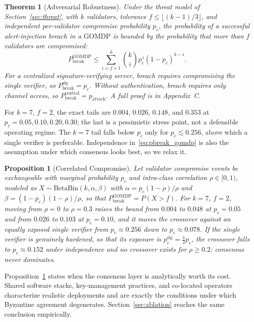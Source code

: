 \documentclass[letterpaper]{article} %
\newtheorem{theorem}{Theorem}
\newtheorem{proposition}{Proposition}
\newcommand{\GOMDP}{\text{GOMDP}}
\newcommand{\Pbreak}{P_{\text{break}}}
\newcommand{\appProofTwo}{C}
\begin{document}
\begin{theorem}[Adversarial Robustness]
\label{thm:adversarial}
Under the threat model of Section~\ref{sec:threat}, with $k$ validators, tolerance $f\leq\lfloor (k-1)/3\rfloor$, and independent per-validator compromise probability $p_c$, the probability of a successful alert-injection breach in a $\GOMDP$ is bounded by the probability that more than $f$ validators are compromised:
\begin{equation}
\Pbreak^{\GOMDP} \leq \sum_{i=f+1}^{k}\binom{k}{i}p_c^{\,i}(1-p_c)^{k-i}.
\label{eq:pbreak_gomdp}
\end{equation}
For a centralized signature-verifying server, breach requires compromising the single verifier, so $\Pbreak^{\mathrm{sig}}=p_c$. Without authentication, breach requires only channel access, so $\Pbreak^{\mathrm{central}}=p_{\mathrm{attack}}$. A full proof is in Appendix~\appProofTwo.
\end{theorem}

For $k=7$, $f=2$, the exact tails are $0.004$, $0.026$, $0.148$, and $0.353$ at $p_c=0.05, 0.10, 0.20, 0.30$; the last is a pessimistic stress point, not a defensible operating regime. The $k=7$ tail falls below $p_c$ only for $p_c\lesssim 0.256$, above which a single verifier is preferable. Independence in~\eqref{eq:pbreak_gomdp} is also the assumption under which consensus looks best, so we relax it.

\begin{proposition}[Correlated Compromise]
\label{prop:correlated}
Let validator compromise events be exchangeable with marginal probability $p_c$ and intra-class correlation $\rho\in[0,1)$, modeled as $X\sim\mathrm{BetaBin}(k,\alpha,\beta)$ with $\alpha=p_c(1-\rho)/\rho$ and $\beta=(1-p_c)(1-\rho)/\rho$, so that $\Pbreak^{\GOMDP}=P(X>f)$. For $k=7$, $f=2$, moving from $\rho=0$ to $\rho=0.3$ raises the bound from $0.004$ to $0.048$ at $p_c=0.05$ and from $0.026$ to $0.103$ at $p_c=0.10$, and it moves the crossover against an equally exposed single verifier from $p_c\approx 0.256$ down to $p_c\approx 0.078$. If the single verifier is genuinely hardened, so that its exposure is $p_c^{\mathrm{sig}}=\tfrac{1}{2}p_c$, the crossover falls to $p_c\approx 0.152$ under independence and \emph{no crossover exists} for $\rho\geq 0.2$: consensus never dominates.
\end{proposition}

Proposition~\ref{prop:correlated} states when the consensus layer is analytically worth its cost. Shared software stacks, key-management practices, and co-located operators characterize realistic deployments and are exactly the conditions under which Byzantine agreement degenerates. Section~\ref{sec:ablation} reaches the same conclusion empirically.
\end{document}
